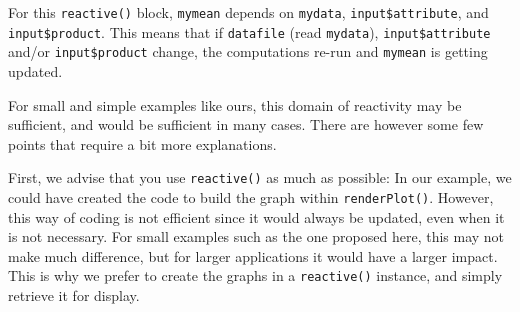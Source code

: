 \documentclass[
]{book}
\newenvironment{Shaded}{\begin{snugshade}}{\end{snugshade}}
\newcommand{\AttributeTok}[1]{\textcolor[rgb]{0.77,0.63,0.00}{#1}}
\newcommand{\DecValTok}[1]{\textcolor[rgb]{0.00,0.00,0.81}{#1}}
\newcommand{\FunctionTok}[1]{\textcolor[rgb]{0.00,0.00,0.00}{#1}}
\newcommand{\NormalTok}[1]{#1}
\newcommand{\OtherTok}[1]{\textcolor[rgb]{0.56,0.35,0.01}{#1}}
\newcommand{\SpecialCharTok}[1]{\textcolor[rgb]{0.00,0.00,0.00}{#1}}
\newcommand{\StringTok}[1]{\textcolor[rgb]{0.31,0.60,0.02}{#1}}
\begin{document}
\begin{Shaded}
\end{Shaded}

For this \texttt{reactive()} block, \texttt{mymean} depends on \texttt{mydata}, \texttt{input\$attribute}, and \texttt{input\$product}. This means that if \texttt{datafile} (read \texttt{mydata}), \texttt{input\$attribute} and/or \texttt{input\$product} change, the computations re-run and \texttt{mymean} is getting updated.

For small and simple examples like ours, this domain of reactivity may be sufficient, and would be sufficient in many cases. There are however some few points that require a bit more explanations.

First, we advise that you use \texttt{reactive()} as much as possible: In our example, we could have created the code to build the graph within \texttt{renderPlot()}. However, this way of coding is not efficient since it would always be updated, even when it is not necessary. For small examples such as the one proposed here, this may not make much difference, but for larger applications it would have a larger impact. This is why we prefer to create the graphs in a \texttt{reactive()} instance, and simply retrieve it for display.
\end{document}
